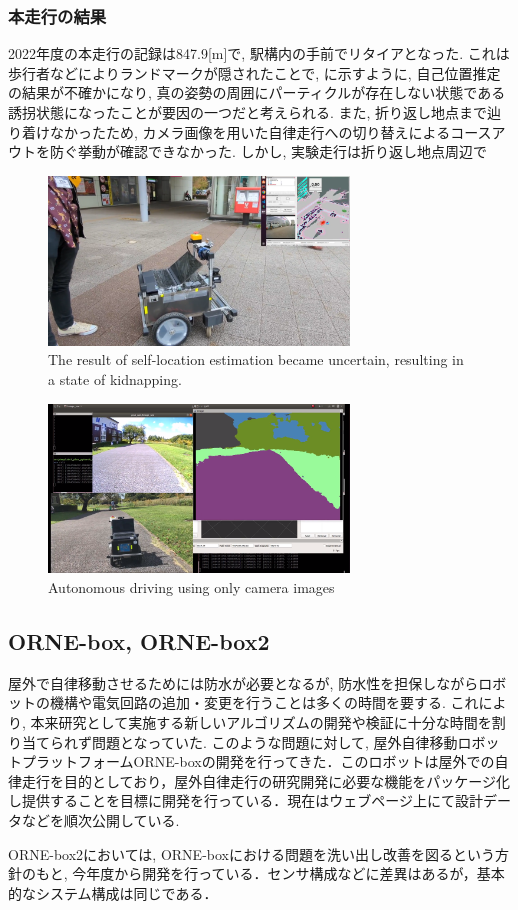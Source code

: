\documentclass[uplatex, twocolumn, 9pt]{jsproceedings}
\begin{document}
\newpage
\subsubsection{本走行の結果}
2022年度の本走行の記録は847.9[m]で, 駅構内の手前でリタイアとなった. これは歩行者などによりランドマークが隠されたことで, に示すように, 自己位置推定の結果が不確かになり, 真の姿勢の周囲にパーティクルが存在しない状態である誘拐状態\cite{emcl-thesis}になったことが要因の一つだと考えられる. また, 折り返し地点まで辿り着けなかったため, カメラ画像を用いた自律走行への切り替えによるコースアウトを防ぐ挙動が確認できなかった. しかし, 実験走行は折り返し地点周辺で

\begin{figure}[h]
  \centering
  \includegraphics[width=80mm]{fig/yuukai2.pdf}
  \caption{The result of self-location estimation became uncertain, resulting in a state of kidnapping.}
  \label{fig:kidnapped}%
\end{figure}

\begin{figure}[h]
  \centering
  \includegraphics[width=80mm]{fig/seg-only.pdf}
  \caption{Autonomous driving using only camera images}
  \label{fig:seg-only}%
\end{figure}

\subsection{ORNE-box, ORNE-box2}
屋外で自律移動させるためには防水が必要となるが, 防水性を担保しながらロボットの機構や電気回路の追加・変更を行うことは多くの時間を要する. これにより, 本来研究として実施する新しいアルゴリズムの開発や検証に十分な時間を割り当てられず問題となっていた. このような問題に対して, 屋外自律移動ロボットプラットフォームORNE-boxの開発\cite{si-box}を行ってきた．このロボットは屋外での自律走行を目的としており，屋外自律走行の研究開発に必要な機能をパッケージ化し提供することを目標に開発を行っている．現在はウェブページ上\cite{box}にて設計データなどを順次公開している. \par 
ORNE-box2においては, ORNE-boxにおける問題を洗い出し改善を図るという方針のもと, 今年度から開発を行っている．センサ構成などに差異はあるが，基本的なシステム構成は同じである．
\end{document}
